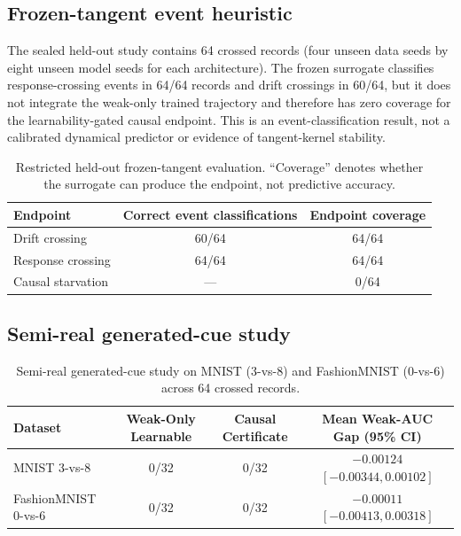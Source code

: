 \documentclass{article}
\theoremstyle{definition}
\theoremstyle{remark}
\begin{document}
\subsection{Frozen-tangent event heuristic}
The sealed held-out study contains 64 crossed records (four unseen data seeds by eight unseen model seeds for each architecture). The frozen surrogate classifies response-crossing events in 64/64 records and drift crossings in 60/64, but it does not integrate the weak-only trained trajectory and therefore has zero coverage for the learnability-gated causal endpoint. This is an event-classification result, not a calibrated dynamical predictor or evidence of tangent-kernel stability.

\begin{table}[ht]
\centering
\caption{Restricted held-out frozen-tangent evaluation. ``Coverage'' denotes whether the surrogate can produce the endpoint, not predictive accuracy.}
\label{tab:tangent-results}
\small
\begin{tabular}{lcc}
\toprule
Endpoint & Correct event classifications & Endpoint coverage \\
\midrule
Drift crossing & 60/64 & 64/64 \\
Response crossing & 64/64 & 64/64 \\
Causal starvation & --- & 0/64 \\
\bottomrule
\end{tabular}
\end{table}

\subsection{Semi-real generated-cue study}
\begin{table}[ht]
\centering
\caption{Semi-real generated-cue study on MNIST (3-vs-8) and FashionMNIST (0-vs-6) across 64 crossed records.}
\label{tab:app-semi-real}
\small
\begin{tabular}{lccc}
\toprule
Dataset & Weak-Only Learnable & Causal Certificate & Mean Weak-AUC Gap (95\% CI) \\
\midrule
MNIST 3-vs-8 & 0/32 & 0/32 & $-0.00124$ $[-0.00344, 0.00102]$ \\
FashionMNIST 0-vs-6 & 0/32 & 0/32 & $-0.00011$ $[-0.00413, 0.00318]$ \\
\bottomrule
\end{tabular}
\end{table}
\end{document}
